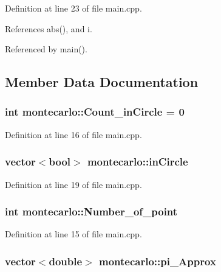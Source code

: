 Definition at line 23 of file main.\-cpp.



References abs(), and i.



Referenced by main().



\subsection{Member Data Documentation}
\hypertarget{classmontecarlo_a4615741397e49843b540dea2a3dbea09}{
\subsubsection[{Count\-\_\-in\-Circle}]{\setlength{\rightskip}{0pt plus 5cm}int montecarlo\-::\-Count\-\_\-in\-Circle = 0}}\label{classmontecarlo_a4615741397e49843b540dea2a3dbea09}


Definition at line 16 of file main.\-cpp.

\hypertarget{classmontecarlo_a78a6d9422f3d41facdf9b13bfe92c6d5}{
\subsubsection[{in\-Circle}]{\setlength{\rightskip}{0pt plus 5cm}vector$<$bool$>$ montecarlo\-::in\-Circle}}\label{classmontecarlo_a78a6d9422f3d41facdf9b13bfe92c6d5}


Definition at line 19 of file main.\-cpp.

\hypertarget{classmontecarlo_a8512ea7ce9a6daffd0be1e2e806a5ab5}{
\subsubsection[{Number\-\_\-of\-\_\-point}]{\setlength{\rightskip}{0pt plus 5cm}int montecarlo\-::\-Number\-\_\-of\-\_\-point}}\label{classmontecarlo_a8512ea7ce9a6daffd0be1e2e806a5ab5}


Definition at line 15 of file main.\-cpp.

\hypertarget{classmontecarlo_af21cba6dc842d47fc1fe8f0a4d920aa0}{
\subsubsection[{pi\-\_\-\-Approx}]{\setlength{\rightskip}{0pt plus 5cm}vector$<$double$>$ montecarlo\-::pi\-\_\-\-Approx}}\label{classmontecarlo_af21cba6dc842d47fc1fe8f0a4d920aa0}


